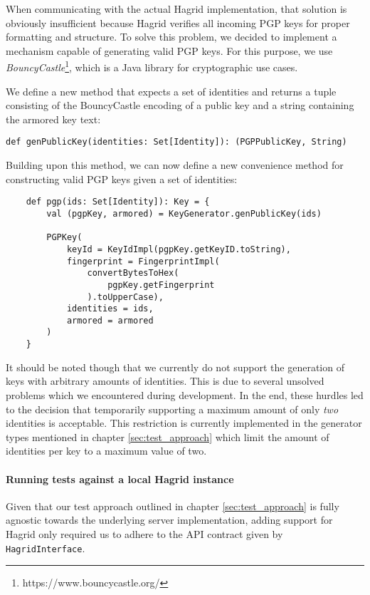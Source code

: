 When communicating with the actual Hagrid implementation, that solution is obviously insufficient because Hagrid verifies all incoming PGP keys for proper formatting and structure. To solve this problem, we decided to implement a mechanism capable of generating valid PGP keys. 
For this purpose, we use \emph{BouncyCastle}\footnote{https://www.bouncycastle.org/}, which is a Java library for cryptographic use cases.

We define a new method that expects a set of identities and returns a tuple consisting of the BouncyCastle encoding of a public key and a string containing the armored key text:
\begin{verbatim}
def genPublicKey(identities: Set[Identity]): (PGPPublicKey, String)
\end{verbatim}

Building upon this method, we can now define a new convenience method for constructing valid PGP keys given a set of identities: 
\begin{code}
    \begin{verbatim}
    def pgp(ids: Set[Identity]): Key = {
        val (pgpKey, armored) = KeyGenerator.genPublicKey(ids)
    
        PGPKey(
            keyId = KeyIdImpl(pgpKey.getKeyID.toString),
            fingerprint = FingerprintImpl(
                convertBytesToHex(
                    pgpKey.getFingerprint
                ).toUpperCase),
            identities = ids,
            armored = armored
        )
    }
    \end{verbatim}
\end{code}
It should be noted though that we currently do not support the generation of keys with arbitrary amounts of identities. This is due to several unsolved problems which we encountered during development. In the end, these hurdles led to the decision that temporarily supporting a maximum amount of only \emph{two} identities is acceptable. This restriction is currently implemented in the generator types mentioned in chapter \ref{sec:test_approach} which limit the amount of identities per key to a maximum value of two.
\paragraph{Running tests against a local Hagrid instance} Given that our test approach outlined in chapter \ref{sec:test_approach} is fully agnostic towards the underlying server implementation, adding support for Hagrid only required us to adhere to the API contract given by \texttt{HagridInterface}.
